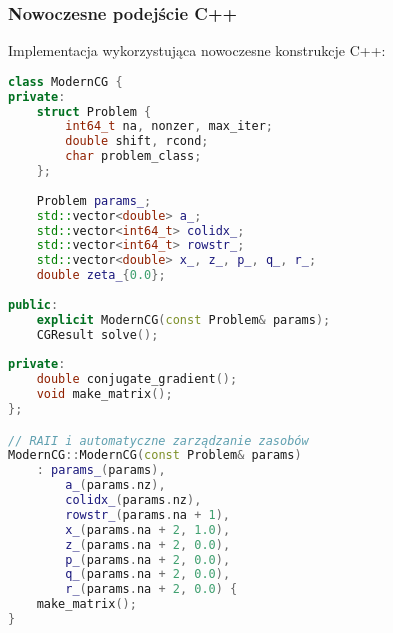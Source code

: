 \subsubsection{Nowoczesne podejście C++}
Implementacja wykorzystująca nowoczesne konstrukcje C++:
\begin{lstlisting}[language=C++, caption={Nowoczesna struktura benchmarku CG w języku C++}, label={lst:cg_modern_cpp_structure}]
class ModernCG {
private:
    struct Problem {
        int64_t na, nonzer, max_iter;
        double shift, rcond;
        char problem_class;
    };
    
    Problem params_;
    std::vector<double> a_;
    std::vector<int64_t> colidx_;
    std::vector<int64_t> rowstr_;
    std::vector<double> x_, z_, p_, q_, r_;
    double zeta_{0.0};
    
public:
    explicit ModernCG(const Problem& params);
    CGResult solve();
    
private:
    double conjugate_gradient();
    void make_matrix();
};

// RAII i automatyczne zarządzanie zasobów
ModernCG::ModernCG(const Problem& params) 
    : params_(params),
        a_(params.nz),
        colidx_(params.nz),
        rowstr_(params.na + 1),
        x_(params.na + 2, 1.0),
        z_(params.na + 2, 0.0),
        p_(params.na + 2, 0.0),
        q_(params.na + 2, 0.0),
        r_(params.na + 2, 0.0) {
    make_matrix();
}
\end{lstlisting}

